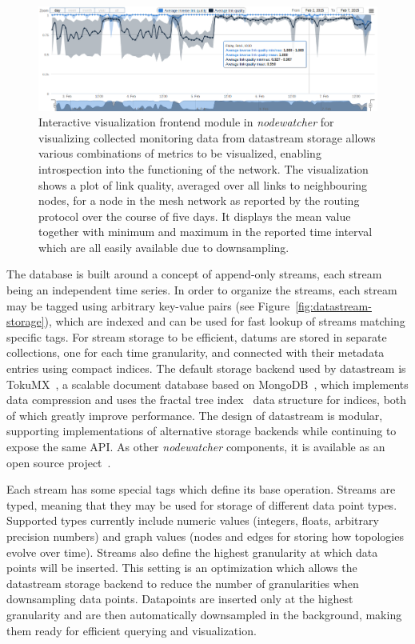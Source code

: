 \documentclass[5p,sort&compress]{elsarticle}
\newcommand{\nodewatcher}{\textit{nodewatcher}}
\begin{document}
\begin{figure}
  \centering
  \includegraphics[scale=0.45]{figures/implementation-interactive-visualization.png}
  \caption{Interactive visualization frontend module in \nodewatcher{} for visualizing collected monitoring data from datastream storage allows various combinations of metrics to be visualized, enabling introspection into the functioning of the network.
  The visualization shows a plot of link quality, averaged over all links to neighbouring nodes, for a node in the mesh network as reported by the routing protocol over the course of five days.
  It displays the mean value together with minimum and maximum in the reported time interval which are all easily available due to downsampling.}
  \label{fig:interactive-visualization}
\end{figure}

The database is built around a concept of append-only streams, each stream being an independent time series.
In order to organize the streams, each stream may be tagged using arbitrary key-value pairs (see Figure~\ref{fig:datastream-storage}), which are indexed and can be used for fast lookup of streams matching specific tags.
For stream storage to be efficient, datums are stored in separate collections, one for each time granularity, and connected with their metadata entries using compact indices.
The default storage backend used by datastream is TokuMX~\cite{TokuMX_2007}, a scalable document database based on MongoDB~\cite{MongoDB_2007}, which implements data compression and uses the fractal tree index~\cite{Brodal_2003,Bender_2007} data structure for indices, both of which greatly improve performance.
The design of datastream is modular, supporting implementations of alternative storage backends while continuing to expose the same API.
As other \nodewatcher{} components, it is available as an open source project~\cite{Datastream_2012}.

Each stream has some special tags which define its base operation.
Streams are typed, meaning that they may be used for storage of different data point types.
Supported types currently include numeric values (integers, floats, arbitrary precision numbers) and graph values (nodes and edges for storing how topologies evolve over time).
Streams also define the highest granularity at which data points will be inserted.
This setting is an optimization which allows the datastream storage backend to reduce the number of granularities when downsampling data points.
Datapoints are inserted only at the highest granularity and are then automatically downsampled in the background, making them ready for efficient querying and visualization.
\end{document}
